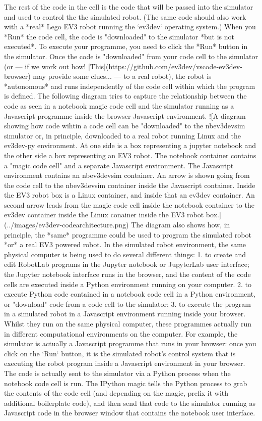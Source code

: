 \documentclass[letterpaper,10pt,english]{sphinxmanual}
\begin{document}
{The rest of the code in the cell is the code that will be passed into the simulator and used to control the the simulated robot. (The same code should also work with a *real* Lego EV3 robot running the `ev3dev` operating system.)
When you *Run* the code cell, the code is "downloaded" to the simulator *but is not executed*.
To execute your programme, you need to click the *Run* button in the simulator. Once the code is "downloaded" from your code cell to the simulator (or — if we work out how! [This](https://github.com/ev3dev/vscode-ev3dev-browser) may provide some clues... — to a real robot), the robot is *autonomous* and runs independently of the code cell within which the program is defined.
The following diagram tries to capture the relationship between the code as seen in a notebook magic code cell and the simulator running as a Javascript programme inside the browser Javascript environment.
![A diagram showing how code wihtin a code cell can be "downloaded" to the nbev3devsim simulator or, in principle, downloaded to a real robot running Linux and the ev3dev-py environment. At one side is a box representing a jupyter notebook and the other side a box representing an EV3 robot. The notebook container contains a "magic code cell" and a separate Javascript environment. The Javascript environment contains an nbev3devsim container. An arrow is shown going from the code cell to the nbev3devsim container inside the Javascript container. Inside the EV3 robot box is a Linux container, and inside that an ev3dev container. An second arrow leads from the magic code cell inside the notebook container to the ev3dev container inside the Linux conainer inside the EV3 robot box.](../images/ev3dev-codearchitecture.png)
The diagram also shows how, in principle, the *same* programme could be used to program the simulated robot *or* a real EV3 powered robot.
In the simulated robot environment, the same physical computer is being used to do several different things:
1. to create and edit RobotLab programs in the Jupyter notebook or JupyterLab user interface; the Jupyter notebook interface runs in the browser, and the content of the code cells are executed inside a Python environment running on your computer.
2. to execute Python code contained in a notebook code cell in a Python environment, or "download" code from a code cell to the simulator;
3. to execute the program in a simulated robot in a Javascript environment running inside your browser.
Whilst they run on the same physical computer, these programmes actually run in different computational environments on the computer. For example, the simulator is actually a Javascript programme that runs in your browser: once you click on the `Run` button, it is the simulated robot’s control system that is executing the robot program inside a Javascript environment in your browser. The code is actually sent to the simulator via a Python process when the notebook code cell is run. The IPython magic tells the Python process to grab the contents of the code cell (and depending on the magic, prefix it with additional boilerplate code), and then send that code to the simulator running as Javascript code in the browser window that contains the notebook user interface.
}
\end{document}
